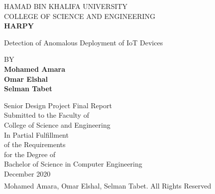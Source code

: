 \documentclass{article}
\begin{document}
\begin{titlepage}
   \begin{center}
       \Large
       HAMAD BIN KHALIFA UNIVERSITY\\
       
       COLLEGE OF SCIENCE AND ENGINEERING\\
       
       \Huge
       \textbf{HARPY}
       
       
       \Large
        Detection of Anomalous Deployment of IoT Devices
            
       \vspace{0.5cm}
       BY\\
       
       \textbf{Mohamed Amara}\\
       \textbf{Omar Elshal}\\
       \textbf{Selman Tabet}\\

       \vfill
            
       \vspace{0.25cm}
       \Large
     
       Senior Design Project Final Report\\
       
       Submitted to the Faculty of\\
       
       College of Science and Engineering\\
      
       In Partial Fulfillment\\
       
       of the Requirements\\
       
       for the Degree of\\
      
       Bachelor of Science in Computer Engineering\\
       \vspace{0.5cm}
       December 2020\\
       
       \textsuperscript{\textcopyright} Mohamed Amara, Omar Elshal, Selman Tabet. All Rights Reserved
            
   \end{center}
\end{titlepage}
\end{document}
